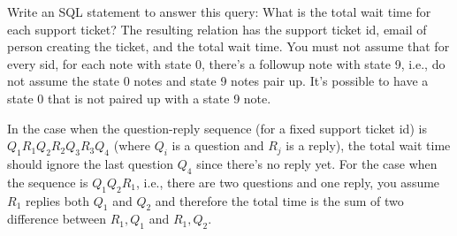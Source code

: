 Write an SQL statement to answer this query: What is the total wait time for
each support ticket?
The resulting relation has the support ticket id, email of person creating the
ticket, and the total wait time.
You must not assume that for every sid, for each note with state 0, there's
a followup note with state 9, i.e.,
do not assume the state 0 notes and state 9 notes
pair up.
It's possible to have a state 0 that is not paired up with a state 9 note.

In the case when the question-reply sequence (for a fixed
support ticket id) is
$Q_1 R_1 Q_2 R_2 Q_3 R_3 Q_4$ (where $Q_i$ is a question
and $R_j$ is a reply), the total wait time should ignore the
last question $Q_4$ since there's no reply yet.
For the case when the sequence is $Q_1 Q_2 R_1$, i.e., there are
two questions and one reply, you assume 
$R_1$ replies both $Q_1$ and $Q_2$ and therefore the
total time is the sum of two difference between
$R_1, Q_1$ and
$R_1, Q_2$.
